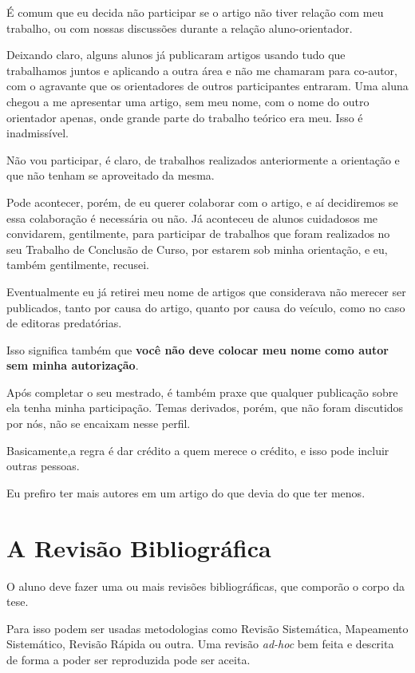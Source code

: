 \documentclass{book}
\begin{document}
É comum que eu decida não participar se o artigo não tiver relação com meu trabalho, ou com nossas discussões durante a relação aluno-orientador. 

Deixando claro, alguns alunos já publicaram artigos usando tudo que trabalhamos juntos e aplicando a outra área e não me chamaram para co-autor, com o agravante que os orientadores de outros participantes entraram. Uma aluna chegou a me apresentar uma artigo, sem meu nome, com o nome do outro orientador apenas, onde grande parte do trabalho teórico era meu. Isso é inadmissível. 

Não vou participar, é claro, de trabalhos realizados anteriormente a orientação e que não tenham se aproveitado da mesma.

Pode acontecer, porém, de eu querer colaborar com o artigo, e aí decidiremos se essa colaboração é necessária ou não. Já aconteceu de alunos cuidadosos me convidarem, gentilmente, para participar de trabalhos que foram realizados no seu Trabalho de Conclusão de Curso, por estarem sob minha orientação, e eu, também gentilmente, recusei.

Eventualmente eu já retirei meu nome de artigos que considerava não merecer ser publicados, tanto por causa do artigo, quanto por causa do veículo, como no caso de editoras predatórias.

Isso significa também que \textbf{você não deve colocar meu nome como autor sem minha autorização}.

Após completar o seu mestrado, é também praxe que qualquer publicação sobre ela tenha minha participação. 
Temas derivados, porém, que não foram discutidos por nós, não se encaixam nesse perfil. 

Basicamente,a regra é dar crédito a quem merece o crédito, e isso pode incluir outras pessoas. 

Eu prefiro ter mais autores em um artigo do que devia do que ter menos.

\chapter{A Revisão Bibliográfica}

O aluno deve fazer uma ou mais revisões bibliográficas, que comporão o corpo da tese. 

Para isso podem ser usadas metodologias como Revisão Sistemática, Mapeamento Sistemático, Revisão Rápida ou outra. Uma revisão \textit{ad-hoc} bem feita e descrita de forma a poder ser reproduzida pode ser aceita.
\end{document}
